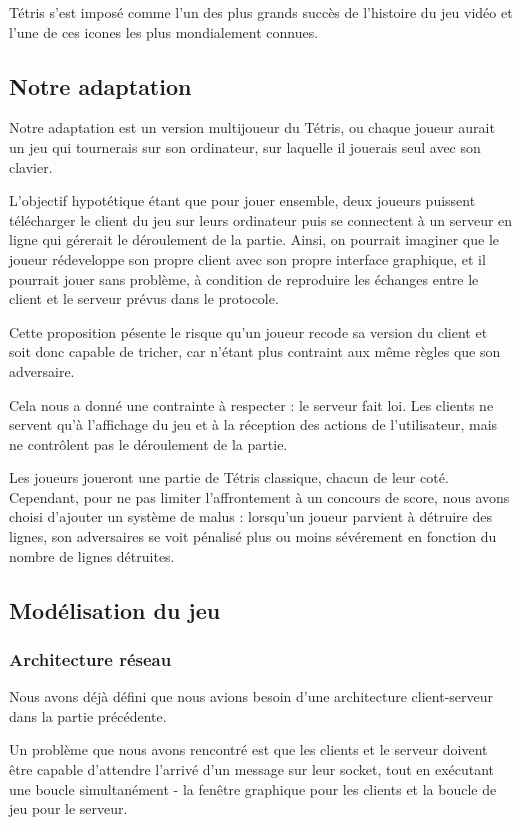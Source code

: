 \documentclass[a4paper, 12pt]{article}
\begin{document}
		Tétris s'est imposé comme l'un des plus grands succès de l'histoire du jeu vidéo et l'une de ces icones les plus mondialement connues.

	\subsection{Notre adaptation}
		Notre adaptation est un version multijoueur du Tétris, ou chaque joueur aurait un jeu qui tournerais sur son ordinateur, sur laquelle il jouerais seul avec son clavier. 

		L'objectif hypotétique étant que pour jouer ensemble, deux joueurs puissent télécharger le client du jeu sur leurs ordinateur puis se connectent à un serveur en ligne qui gérerait le déroulement de la partie. 
		Ainsi, on pourrait imaginer que le joueur rédeveloppe son propre client avec son propre interface graphique, et il pourrait jouer sans problème, à condition de reproduire les échanges entre le client et le serveur prévus dans le protocole.

		Cette proposition pésente le risque qu'un joueur recode sa version du client et soit donc capable de tricher, car n'étant plus contraint aux même règles que son adversaire.

		Cela nous a donné une contrainte à respecter : le serveur fait loi. Les clients ne servent qu'à l'affichage du jeu et à la réception des actions de l'utilisateur, mais ne contrôlent pas le déroulement de la partie.

		Les joueurs joueront une partie de Tétris classique, chacun de leur coté. Cependant, pour ne pas limiter l'affrontement à un concours de score, nous avons choisi d'ajouter un système de malus : lorsqu'un joueur parvient à détruire des lignes, son adversaires se voit pénalisé plus ou moins sévérement en fonction du nombre de lignes détruites.

	\subsection{Modélisation du jeu}

		\subsubsection{Architecture réseau}

			Nous avons déjà défini que nous avions besoin d'une architecture client-serveur dans la partie précédente.

			Un problème que nous avons rencontré est que les clients et le serveur doivent être capable d'attendre l'arrivé d'un message sur leur socket, tout en exécutant une boucle simultanément - la fenêtre graphique pour les clients et la boucle de jeu pour le serveur.
\end{document}
